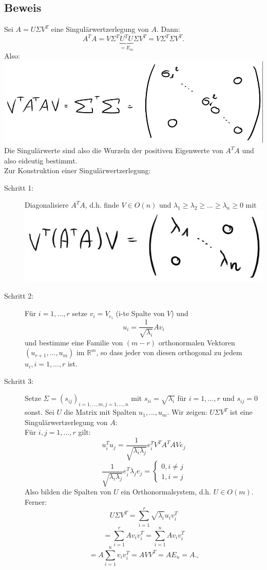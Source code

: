 \documentclass{scrbook}
\begin{document}
\subsection*{Beweis}
Sei $A = U \Sigma V^T$ eine Singulärwertzerlegung von $A$. Dann:
\[A^TA = V\Sigma^T \underbrace{U^TU}_{=E_m} \Sigma V^T = V \Sigma^T \Sigma V^T. \]
Also:
\includegraphics{Beweis_14_1_1.jpeg}\\
Die Singulärwerte sind also die Wurzeln der positiven Eigenwerte von $A^TA$ und also eideutig bestimmt.\\
Zur Konstruktion einer Singulärwertzerlegung:
\begin{description}
\item[Schritt 1:] Diagonalisiere $A^TA$, d.h. finde $V \in O(n)$ und $\lambda_1 \geq \lambda_2 \geq ... \geq \lambda_n \geq 0$ mit\\
\includegraphics{Beweis_14_1_2.jpeg}\\
\item[Schritt 2:] Für $i=1,...,r$ setze $v_i = V_{e_i}$ (i-te Spalte von $V$) und
\[
u_i = \frac{1}{\sqrt{\lambda_i} }Av_i
\]
und bestimme eine Familie von $(m-r)$ orthonormalen Vektoren $(u_{r+1},...,u_{m})$ im $\mathbb{R}^m$, so dass jeder von diesen orthogonal zu jedem $u_i,i=1,...,r$ ist.
\item[Schritt 3:] Setze $ \Sigma = (s_{ij})_{i=1,...,m,j=1,...,n}$ mit $s_{ii} = \sqrt{\lambda_i}$ für $i=1,...,r$ und $s_{ij} = 0$ sonst. Sei $U$ die Matrix mit Spalten $u_1,...,u_m$. Wir zeigen: $U\Sigma V^T$ ist eine Singulärwertzerlegung von $A$:\\
Für $i,j = 1,...,r$ gilt:
\[u^T_i u_j = \frac{1}{\sqrt{\lambda_i \lambda_j}} e_i^T V^TA^TAVe_j\]
\[\frac{1}{\sqrt{\lambda_i\lambda_j}} e_i^T \lambda_j e_j = \left\{ 
\begin{array}{c}
0, i\neq j\\
1, i=j
\end{array}
\right.\]
Also bilden die Spalten von $U$ ein Orthonormalsystem, d.h. $U \in O(m)$.\\
Ferner:
\[U \Sigma V^T = \sum^r_{i=1} \sqrt{\lambda_i} u_i v_i^T\]
\[=\sum^r_{i=1}Av_iv_i^T = \sum^n_{i=1}Av_iv_i^T\]
\[=A \sum^n_{i=1}v_iv_i^T = AVV^T = AE_n = A. _\square\]
\end{description}
\end{document}
